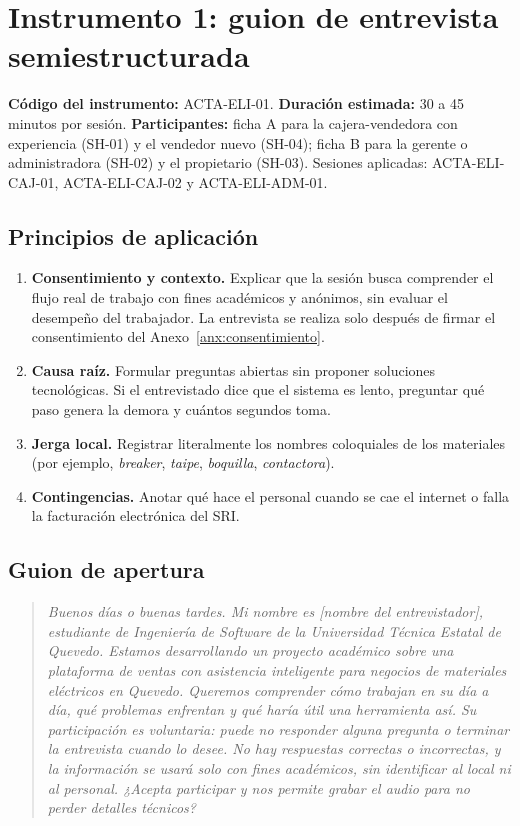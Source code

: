 \section{Instrumento 1: guion de entrevista semiestructurada}\label{anx:entrevista}

\textbf{Código del instrumento:} ACTA-ELI-01. \textbf{Duración estimada:} 30 a 45 minutos por sesión. \textbf{Participantes:} ficha A para la cajera-vendedora con experiencia (SH-01) y el vendedor nuevo (SH-04); ficha B para la gerente o administradora (SH-02) y el propietario (SH-03). Sesiones aplicadas: ACTA-ELI-CAJ-01, ACTA-ELI-CAJ-02 y ACTA-ELI-ADM-01.

\subsection*{Principios de aplicación}
\begin{enumerate}[label=\arabic*.]
\item \textbf{Consentimiento y contexto.} Explicar que la sesión busca comprender el flujo real de trabajo con fines académicos y anónimos, sin evaluar el desempeño del trabajador. La entrevista se realiza solo después de firmar el consentimiento del Anexo~\ref{anx:consentimiento}.
\item \textbf{Causa raíz.} Formular preguntas abiertas sin proponer soluciones tecnológicas. Si el entrevistado dice que el sistema es lento, preguntar qué paso genera la demora y cuántos segundos toma.
\item \textbf{Jerga local.} Registrar literalmente los nombres coloquiales de los materiales (por ejemplo, \emph{breaker}, \emph{taipe}, \emph{boquilla}, \emph{contactora}).
\item \textbf{Contingencias.} Anotar qué hace el personal cuando se cae el internet o falla la facturación electrónica del SRI.
\end{enumerate}

\subsection*{Guion de apertura}
\begin{quote}\itshape
Buenos días o buenas tardes. Mi nombre es [nombre del entrevistador], estudiante de Ingeniería de Software de la Universidad Técnica Estatal de Quevedo. Estamos desarrollando un proyecto académico sobre una plataforma de ventas con asistencia inteligente para negocios de materiales eléctricos en Quevedo. Queremos comprender cómo trabajan en su día a día, qué problemas enfrentan y qué haría útil una herramienta así. Su participación es voluntaria: puede no responder alguna pregunta o terminar la entrevista cuando lo desee. No hay respuestas correctas o incorrectas, y la información se usará solo con fines académicos, sin identificar al local ni al personal. ¿Acepta participar y nos permite grabar el audio para no perder detalles técnicos?
\end{quote}

